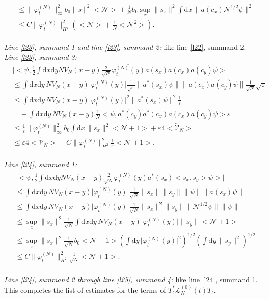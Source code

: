 \documentclass[11pt,a4paper,draft,DIV11]{scrartcl}	%
\newcommand{\di}{\textrm{d}}		%
\newcommand{\Lcal}{\mathcal{L}}		%
\newcommand{\Ncal}{\mathcal{N}}		%
\newcommand{\tilV}{\tilde{\mathcal{V}}_N}		%
\newcommand{\estlist}[2]{\emph{\vspace{.3em}\\Line \ref{l#1}, summand #2:}}
\newcommand{\nestlist}[2]{line \ref{l#1}, summand #2}
\newcommand{\Nestlist}[2]{Line \ref{l#1}, summand #2}
\newcommand{\scal}[2]{\big<#1,#2\big>} %
\newcommand{\cc}[1]{\overline{#1}}	%
\newcommand{\norm}[1]{\lVert#1\rVert}	%
\newcommand{\ev}[1]{\big<#1\big>}	%
\newcommand{\ph}{\varphi_t^{(N)}}	%
\newcommand{\dxyNV}{\frac{1}{2}\int \di x\di y N V_N(x-y)} %
\begin{document}
\begin{fleqn}[0.5em]
\begin{align*}
& \leq \norm{\ph}_\infty^2 b_0 \norm{s}^2 \ev{\Ncal} + \frac{1}{N}b_0 \sup_x\norm{s_x}^2 \int \di x\, \norm{a(c_x)\Ncal^{1/2}\psi}^2 \\
& \leq C \norm{\ph}_{H^2}^2 \left( \ev{\Ncal} + \frac{1}{N}\ev{\Ncal^2}\right). 
\end{align*}
\emph{\vspace{.3em}\\\Nestlist{23}{1} and \nestlist{23}{2}:} %
like \nestlist{22}{2}.\newline
\estlist{23}{3}
\begin{align*}
& \lvert \scal{\psi}{\dxyNV \frac{2}{\sqrt{N}} \cc{\ph(y)} a(s_x) a(c_x) a(c_y)\psi} \rvert \\
& \leq \int \di x\di y\, NV_N(x-y) \lvert \ph(y)\rvert \frac{1}{\sqrt{\varepsilon}} \norm{a^\ast(s_x)\psi} \norm{a(c_x)a(c_y)\psi}\frac{1}{\sqrt{N}}\sqrt{\varepsilon} \\
& \leq \int \di x\di y\, NV_N(x-y) \lvert \ph(y)\rvert^2
  \norm{a^\ast(s_x)\psi}^2\frac{1}{\varepsilon} \\
& \quad + \int \di x\di y\, NV_N(x-y) \frac{1}{N} \scal{\psi}{a^\ast(c_y)a^\ast(c_x)a(c_x)a(c_y)\psi}\varepsilon \\
& \leq \frac{1}{\varepsilon} \norm{\ph}_\infty^2 b_0 \int \di x\, \norm{s_x}^2 \ev{\Ncal+1} + \varepsilon 4 \ev{\tilV}\\
& \leq \varepsilon 4 \ev{\tilV} + C\norm{\ph}_{H^2}^2 \frac{1}{\varepsilon}\ev{\Ncal+1}.
\end{align*}
\estlist{24}{1}
\begin{align*}
 & \lvert \scal{\psi}{\dxyNV \frac{2}{\sqrt{N}}\cc{\ph(y)}a^\ast(s_x)\scal{s_x}{s_y}\psi} \rvert \\
& \leq \int \di x\di y\, NV_N(x-y) \lvert \ph(y)\rvert \frac{1}{\sqrt{N}} \norm{s_x} \norm{s_y} \norm{\psi} \norm{a(s_x)\psi} \\
& \leq \int \di x\di y\, NV_N(x-y) \lvert \ph(y)\rvert \frac{1}{\sqrt{N}} \norm{s_x}^2 \norm{s_y} \norm{\Ncal^{1/2}\psi} \norm{\psi} \\
& \leq \sup_x \norm{s_x}^2 \frac{1}{\sqrt{N}} \int \di x\di y\, NV_N(x-y) \lvert \ph(y)\rvert \norm{s_y} \ev{\Ncal+1} \\
& \leq \sup_x \norm{s_x}^2 \frac{1}{\sqrt{N}} b_0 \ev{\Ncal+1} \left( \int \di y\, \lvert \ph(y)\rvert^2 \right)^{1/2} \left( \int \di y\, \norm{s_y}^2 \right)^{1/2} \\
& \leq C\norm{\ph}_{H^2}^2 \frac{1}{\sqrt{N}}\ev{\Ncal+1}.
\end{align*}
\emph{\vspace{.3em}\\\Nestlist{24}{2} through \nestlist{25}{4}:} like \nestlist{24}{1}.\vspace{.3em}\newline
This completes the list of estimates for the terms of $T^*_t \Lcal_N^{(0)}(t) T_t$.\vspace{1em}
\end{fleqn}
\end{document}
